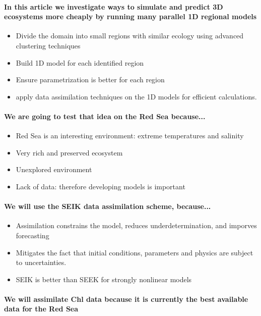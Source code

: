 \paragraph{In this article we investigate ways to simulate and predict
3D ecosystems more cheaply by running many parallel 1D regional models}

\begin{itemize}
  \item Divide the domain into small regions with similar ecology using
advanced clustering techniques
  \item Build 1D model for each identified region
  \item Ensure parametrization is better for each region
  \item apply data assimilation techniques on the 1D models for efficient
calculations.
\end{itemize}

\paragraph{We are going to test that idea on the Red Sea because...}

\begin{itemize}
  \item Red Sea is an interesting environment: extreme temperatures and
salinity
  \item Very rich and preserved ecosystem
  \item Unexplored environment
  \item Lack of data: therefore developing models is important
\end{itemize}

\paragraph{We will use the SEIK data assimilation scheme, because...}

\begin{itemize}
  \item Assimilation constrains the model, reduces underdetermination,
and imporves forecasting
  \item Mitigates the fact that initial conditions, parameters and physics
are subject to uncertainties.
  \item SEIK is better than SEEK for strongly nonlinear models
\end{itemize}

\paragraph{We will assimilate Chl data because it is currently
the best available data for the Red Sea}

